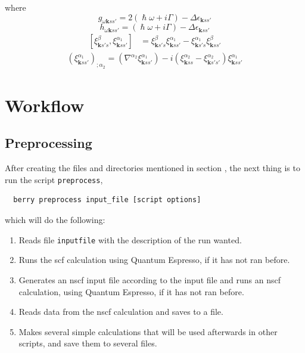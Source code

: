 \documentclass[a4paper,12pt]{report}
\begin{document}
where
\begin{equation}
 g_{\omega\pmb{k}ss'} = 2(\hslash\omega + i\Gamma) - \Delta\epsilon_{\pmb{k}ss'}
\end{equation}
\begin{equation}
 h_{\omega\pmb{k}ss'} = (\hslash\omega + i\Gamma) - \Delta\epsilon_{\pmb{k}ss'}
\end{equation}
\begin{align}
  \left[ \xi_{\pmb{k}s's}^{\beta},\xi_{\pmb{k}ss'}^{\alpha_1}\right] &=
  \xi_{\pmb{k}s's}^{\beta}\xi_{\pmb{k}ss'}^{\alpha_1} - \xi_{\pmb{k}s's}^{\alpha_1}\xi_{\pmb{k}ss'}^{\beta}
\end{align}
\begin{align}
 (\xi_{\pmb{k}ss'}^{\alpha_1})_{;\alpha_2}=
  \left( \nabla^{\alpha_2} \xi_{\pmb{k}ss'}^{\alpha_1}  \right) - i\left( \xi_{\pmb{k}ss}^{\alpha_2} - \xi_{\pmb{k}s's'}^{\alpha_2}\right) \xi_{\pmb{k}ss'}^{\alpha_1}
\end{align}







\chapter{Workflow}\label{ch:workflow}



\section{Preprocessing}\label{sec:preprocessing}
 After creating the files and directories mentioned in section , the next thing is
 to run the script \texttt{preprocess},
 \begin{verbatim}
  berry preprocess input_file [script options]
 \end{verbatim}
 which will do the following:
 \begin{enumerate}
  \item Reads file \texttt{inputfile} with the description of the run wanted.
  \item Runs the scf calculation using {\sc Quantum Espresso}, if it has not ran before.
  \item Generates an nscf input file according to the input file and runs an nscf calculation,
  using {\sc Quantum Espresso}, if it has not ran before.
  \item Reads data from the nscf calculation and saves to a file.
  \item Makes several simple calculations that will be used afterwards in other scripts,
  and save them to several files.
 \end{enumerate}
\end{document}
